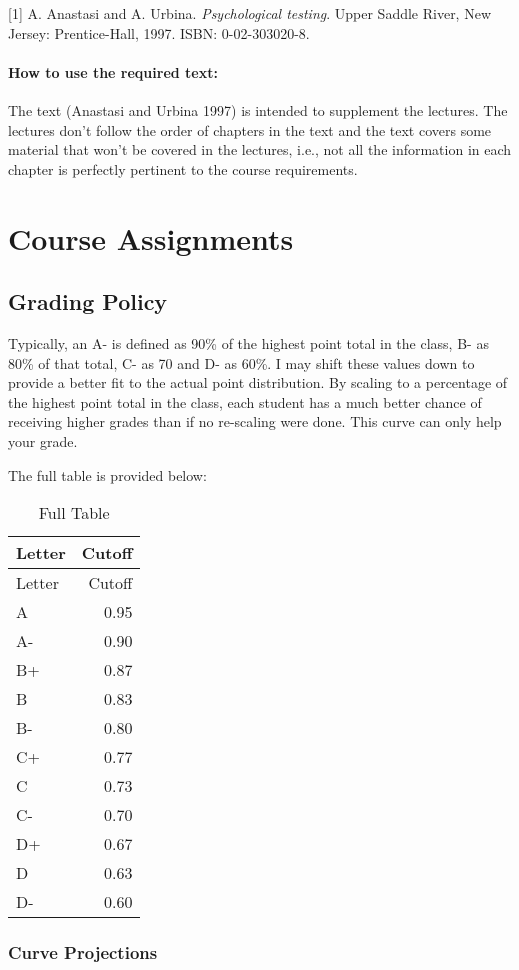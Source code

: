 \documentclass[11pt,]{article}
\begin{document}
{[}1{]} A. Anastasi and A. Urbina. \emph{Psychological testing}. Upper
Saddle River, New Jersey: Prentice-Hall, 1997. ISBN: 0-02-303020-8.

\hypertarget{how-to-use-the-required-text}{%
\paragraph{How to use the required
text:}\label{how-to-use-the-required-text}}

The text (Anastasi and Urbina 1997) is intended to supplement the
lectures. The lectures don't follow the order of chapters in the text
and the text covers some material that won't be covered in the lectures,
i.e., not all the information in each chapter is perfectly pertinent to
the course requirements.

\hypertarget{course-assignments}{%
\section{Course Assignments}\label{course-assignments}}

\hypertarget{grading-policy}{%
\subsection{Grading Policy}\label{grading-policy}}

Typically, an A- is defined as 90\% of the highest point total in the
class, B- as 80\% of that total, C- as 70 and D- as 60\%. I may shift
these values down to provide a better fit to the actual point
distribution. By scaling to a percentage of the highest point total in
the class, each student has a much better chance of receiving higher
grades than if no re-scaling were done. This curve can only help your
grade.

The full table is provided below:

\begin{longtable}[]{@{}lr@{}}
\caption{Full Table}\tabularnewline
\toprule
Letter & Cutoff\tabularnewline
\midrule
\endfirsthead
\toprule
Letter & Cutoff\tabularnewline
\midrule
\endhead
A & 0.95\tabularnewline
A- & 0.90\tabularnewline
B+ & 0.87\tabularnewline
B & 0.83\tabularnewline
B- & 0.80\tabularnewline
C+ & 0.77\tabularnewline
C & 0.73\tabularnewline
C- & 0.70\tabularnewline
D+ & 0.67\tabularnewline
D & 0.63\tabularnewline
D- & 0.60\tabularnewline
\bottomrule
\end{longtable}

\hypertarget{curve-projections}{%
\subsubsection{Curve Projections}\label{curve-projections}}
\end{document}
